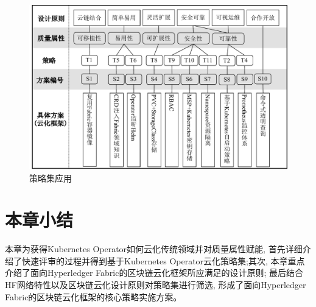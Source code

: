 \begin{figure}[h] %
    \centering %
    \includegraphics[width=1.0\textwidth]{FIGs/chapter3/policy_characteristics.pdf} %
    \caption{策略集应用} %
    \label{policy_set_application} %
\end{figure}%


\section{本章小结}

本章为获得Kubernetes Operator如何云化传统领域并对质量属性赋能, 首先详细介绍了快速评审的过程并得到基于Kubernetes Operator云化策略集;其次, 本章重点介绍了面向Hyperledger Fabric的区块链云化框架所应满足的设计原则; 最后结合HF网络特性以及区块链云化设计原则对策略集进行筛选, 形成了面向Hyperledger Fabric的区块链云化框架的核心策略实施方案。